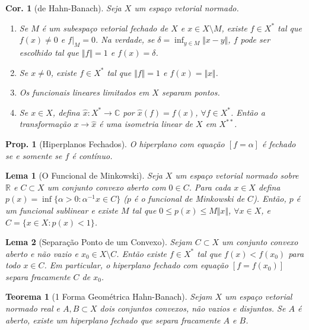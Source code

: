\documentclass[11pt]{article}
\theoremstyle{yellowhead}
\newtheorem*{theorem}{Teorema}
\newtheorem*{lemma}{Lema}
\newtheorem*{proposition}{Prop.}
\newtheorem*{corollary}{Cor.}
\theoremstyle{yellowdef}
\begin{document}
\begin{multicols}{3}
\begin{corollary}[de Hahn-Banach]
Seja $X$ um espaço vetorial normado.
\begin{enumerate}
    \item Se $M$ é um subespaço vetorial fechado de $X$ e $x \in X \setminus M$, existe $f \in X^*$ tal que $f(x) \neq 0$ e $f|_M = 0$. Na verdade, se $\delta = \inf_{y \in M} \Vert x - y \Vert$, $f$ pode ser escolhido tal que $\Vert f \Vert = 1$ e $f(x) = \delta$.
    \item Se $x \neq 0$, existe $f \in X^*$ tal que $\Vert f \Vert = 1$ e $f(x) = \Vert x \Vert$.
    \item Os funcionais lineares limitados em $X$ separam pontos.
    \item Se $x \in X$, defina $\hat{x}: X^* \to \mathbb{C}$ por \mbox{$\hat{x}(f) = f(x)$}, $\forall f \in X^*$. Então a transformação $x \to \hat{x}$ é uma isometria linear de $X$ em $X^{**}$.
\end{enumerate}
\end{corollary}

\begin{proposition}[Hiperplanos Fechados]
O hiperplano com equação $[f = \alpha]$ é fechado se e somente se $f$ é contínuo.
\end{proposition}

\begin{lemma}[O Funcional de Minkowski]
Seja $X$ um espaço vetorial normado sobre $\mathbb{R}$ e $C \subset X$ um conjunto convexo aberto com $0 \in C$. Para cada $x \in X$ defina $p(x) = \inf\{\alpha > 0 : \alpha^{-1}x \in C\}$ ($p$ é o funcional de Minkowski de $C$). Então, $p$ é um funcional sublinear e existe $M$ tal que $0 \le p(x) \le M\Vert x \Vert$, $\forall x \in X$, e $C = \{x \in X: p(x) < 1\}$.
\end{lemma}

\begin{lemma}[Separação Ponto de um Convexo]
Sejam $C \subset X$ um conjunto convexo aberto e não vazio e $x_0 \in X \setminus C$. Então existe $f \in X^*$ tal que $f(x) < f(x_0)$ para todo $x \in C$. Em particular, o hiperplano fechado com equação $[f = f(x_0)]$ separa fracamente $C$ de $x_0$.
\end{lemma}

\begin{theorem}[1 Forma Geométrica Hahn-Banach]
Sejam $X$ um espaço vetorial normado real e $A, B \subset X$ dois conjuntos convexos, não vazios e disjuntos. Se $A$ é aberto, existe um hiperplano fechado que separa fracamente $A$ e $B$.
\end{theorem}


\end{multicols}
\end{document}
